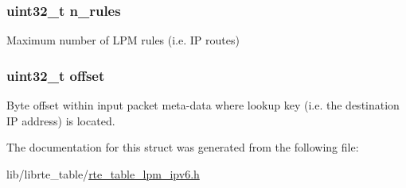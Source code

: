 \subsubsection[{n\+\_\+rules}]{\setlength{\rightskip}{0pt plus 5cm}uint32\+\_\+t n\+\_\+rules}\label{structrte__table__lpm__ipv6__params_a36f832c0360005ce685ffab87c3e188a}
Maximum number of L\+P\+M rules (i.\+e. I\+P routes) \hypertarget{structrte__table__lpm__ipv6__params_a894bdfa2d603d8343f8ef01dda6fcd23}{}
\subsubsection[{offset}]{\setlength{\rightskip}{0pt plus 5cm}uint32\+\_\+t offset}\label{structrte__table__lpm__ipv6__params_a894bdfa2d603d8343f8ef01dda6fcd23}
Byte offset within input packet meta-\/data where lookup key (i.\+e. the destination I\+P address) is located. 

The documentation for this struct was generated from the following file\+:\begin{DoxyCompactItemize}
\item 
lib/librte\+\_\+table/\hyperlink{rte__table__lpm__ipv6_8h}{rte\+\_\+table\+\_\+lpm\+\_\+ipv6.\+h}\end{DoxyCompactItemize}
